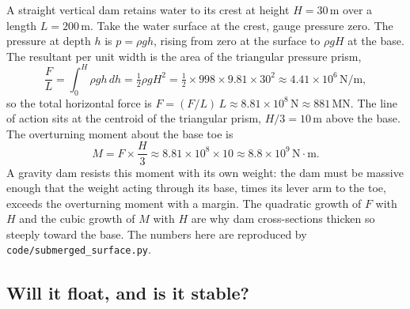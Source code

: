 A straight vertical dam retains water to its crest at height
$H = 30\,\si{\meter}$ over a length $L = 200\,\si{\meter}$. Take the
water surface at the crest, gauge pressure zero. The pressure at depth
$h$ is $p = \rho g h$, rising from zero at the surface to $\rho g H$ at
the base. The resultant per unit width is the area of the triangular
pressure prism,
\[
\frac{F}{L} = \int_0^H \rho g h \,dh = \tfrac12 \rho g H^2
= \tfrac12 \times 998 \times 9.81 \times 30^2
\approx 4.41 \times 10^6\,\text{N/m},
\]
so the total horizontal force is $F = (F/L)\,L \approx 8.81 \times
10^8\,\text{N} \approx 881\,\text{MN}$. The line of action sits at the
centroid of the triangular prism, $H/3 = 10\,\si{\meter}$ above the
base. The overturning moment about the base toe is
\[
M = F \times \frac{H}{3}
\approx 8.81 \times 10^8 \times 10
\approx 8.8 \times 10^9\,\text{N}\cdot\text{m}.
\]
A gravity dam resists this moment with its own weight: the dam must be
massive enough that the weight acting through its base, times its lever
arm to the toe, exceeds the overturning moment with a margin. The
quadratic growth of $F$ with $H$ and the cubic growth of $M$ with $H$
are why dam cross-sections thicken so steeply toward the base. The
numbers here are reproduced by \texttt{code/submerged\_surface.py}.

\subsection{Will it float, and is it stable?}

